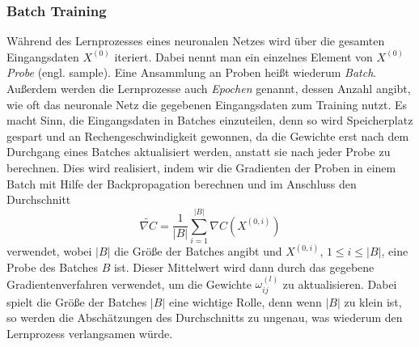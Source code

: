 \subsubsection{Batch Training}
Während des Lernprozesses eines neuronalen Netzes wird über die gesamten Eingangsdaten $X^{(0)}$ iteriert. Dabei nennt
man ein einzelnes Element von $X^{(0)}$ \textit{Probe} (engl. sample). Eine Ansammlung an Proben heißt wiederum
\textit{Batch}. Außerdem werden die Lernprozesse auch \textit{Epochen} genannt, dessen Anzahl angibt, wie oft das
neuronale Netz die gegebenen Eingangsdaten zum Training nutzt. Es macht Sinn, die Eingangsdaten in Batches einzuteilen,
denn so wird Speicherplatz gespart und an Rechengeschwindigkeit gewonnen, da die Gewichte erst nach dem Durchgang eines
Batches aktualisiert werden, anstatt sie nach jeder Probe zu berechnen. Dies wird realisiert, indem wir die Gradienten
der Proben in einem Batch mit Hilfe der Backpropagation berechnen und im Anschluss den Durchschnitt
\[
    \widetilde{\nabla C} = \frac{1}{|B|} \sum_{i=1}^{|B|} \nabla C(X^{(0,i)})
\]
verwendet, wobei $|B|$ die Größe der Batches angibt und $X^{(0,i)}$, $1 \leq i \leq |B|$, eine Probe des Batches $B$ ist.
Dieser Mittelwert wird dann durch das gegebene Gradientenverfahren verwendet, um die Gewichte $\omega_{ij}^{(l)}$ zu
aktualisieren. Dabei spielt die Größe der Batches $|B|$ eine wichtige Rolle, denn wenn $|B|$ zu klein ist, so werden die
Abschätzungen des Durchschnitts zu ungenau, was wiederum den Lernprozess verlangsamen würde.

